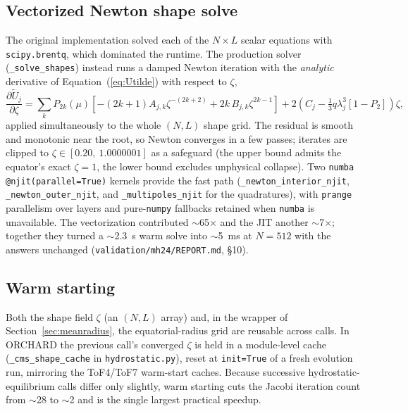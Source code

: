 \documentclass{aastex631}
\begin{document}
\subsection{Vectorized Newton shape solve}

The original implementation solved each of the $N \times L$ scalar
equations with \texttt{scipy.brentq}, which dominated the runtime.  The
production solver (\texttt{\_solve\_shapes}) instead runs a damped
Newton iteration with the \emph{analytic} derivative of
Equation~(\ref{eq:Utilde}) with respect to $\zeta$,
\begin{equation}
\frac{\partial \widetilde{U}_j}{\partial \zeta}
= \sum_k P_{2k}(\mu)\left[ -(2k{+}1) A_{j,k} \zeta^{-(2k+2)}
+ 2k\, B_{j,k} \zeta^{2k-1}\right]
+ 2\left( C_j - \tfrac{1}{3} q \lambda_j^3 \left[1{-}P_2\right]\right)
\zeta ,
\end{equation}
applied simultaneously to the whole $(N,L)$ shape grid.  The residual is
smooth and monotonic near the root, so Newton converges in a few passes;
iterates are clipped to $\zeta \in [0.20,\ 1.0000001]$ as a safeguard
(the upper bound admits the equator's exact $\zeta = 1$, the lower bound
excludes unphysical collapse).  Two \texttt{numba}
\texttt{@njit(parallel=True)} kernels provide the fast path
(\texttt{\_newton\_interior\_njit}, \texttt{\_newton\_outer\_njit},
and \texttt{\_multipoles\_njit} for the quadratures), with
\texttt{prange} parallelism over layers and pure-\texttt{numpy}
fallbacks retained when \texttt{numba} is unavailable.  The
vectorization contributed $\sim$65$\times$ and the JIT another
$\sim$7$\times$; together they turned a $\sim$2.3~s warm solve into
$\sim$5~ms at $N=512$ with the answers unchanged
(\texttt{validation/mh24/REPORT.md}, \S10).

\subsection{Warm starting}\label{sec:warmstart}

Both the shape field $\zeta$ (an $(N,L)$ array) and, in the wrapper of
Section~\ref{sec:meanradius}, the equatorial-radius grid are reusable
across calls.  In ORCHARD the previous call's converged $\zeta$ is held
in a module-level cache (\texttt{\_cms\_shape\_cache} in
\texttt{hydrostatic.py}), reset at \texttt{init=True} of a fresh
evolution run, mirroring the ToF4/ToF7 warm-start caches.  Because
successive hydrostatic-equilibrium calls differ only slightly, warm
starting cuts the Jacobi iteration count from $\sim$28 to $\sim$2 and is
the single largest practical speedup.
\end{document}

